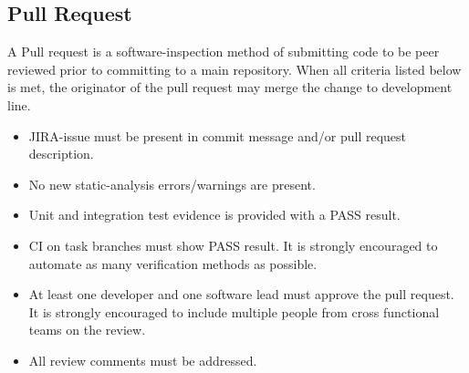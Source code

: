 \subsection{Pull Request}
A Pull request is a \gls{software-inspection} method of submitting code to be
peer reviewed prior to committing to a main repository. When all criteria listed
below is met, the originator of the pull request may merge the change to
development line.

\begin{itemize}
    \item JIRA-issue must be present in commit message and/or pull request
    description.
    \item No new \gls{static-analysis} errors/warnings are present.
    \item Unit and integration test evidence is provided with a PASS result.
    \item CI on task branches must show PASS result. It is strongly encouraged
      to automate as many verification methods as possible.
    \item At least one developer and one software lead must approve the pull
    request. It is strongly encouraged to include multiple people from cross
    functional teams on the review. 
    \item All review comments must be addressed.
\end{itemize}
